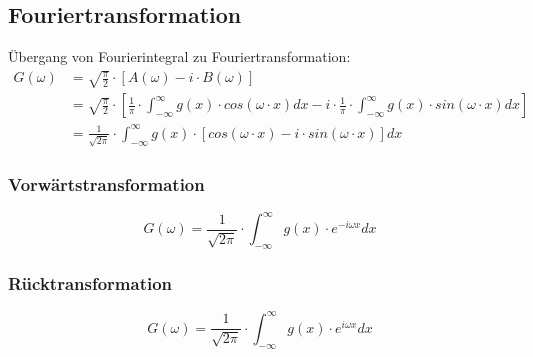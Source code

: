 \documentclass[10pt]{article}
\begin{document}
\subsection{Fouriertransformation}
Übergang von Fourierintegral zu Fouriertransformation:
\begin{align*}
	G(\omega) &= \sqrt{\frac{\pi}{2}} \cdot \left[ A(\omega) - i \cdot B(\omega) \right] \\
	 &= \sqrt{\frac{\pi}{2}} \cdot \left[ \frac{1}{\pi} \cdot \int_{-\infty}^\infty g(x) \cdot cos(\omega \cdot x) dx - i \cdot  \frac{1}{\pi} \cdot  \int_{-\infty}^\infty g(x) \cdot sin(\omega \cdot x) dx \right] \\
	 &= \frac{1}{\sqrt{2 \pi}} \cdot \int_{-\infty}^\infty g(x) \cdot \left[ cos(\omega \cdot x) - i \cdot sin(\omega \cdot x) \right] dx
\end{align*}
\subsubsection*{Vorwärtstransformation}
\begin{equation*}
	G(\omega) = \frac{1}{\sqrt{2 \pi}} \cdot \int_{-\infty}^\infty g(x) \cdot e^{-i \omega x} dx
\end{equation*}
\subsubsection*{Rücktransformation}
\begin{equation*}
	G(\omega) = \frac{1}{\sqrt{2 \pi}} \cdot \int_{-\infty}^\infty g(x) \cdot e^{i \omega x} dx
\end{equation*}
\end{document}
